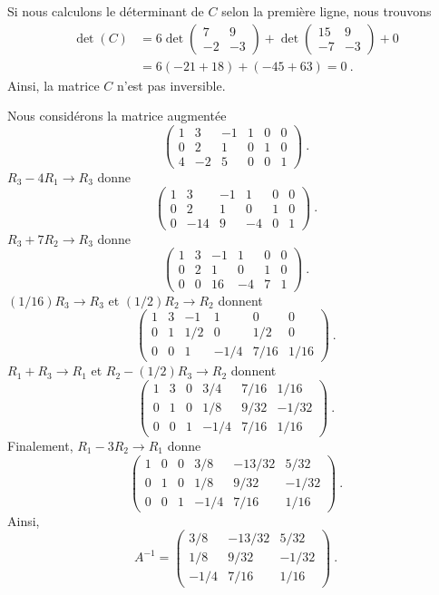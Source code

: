 { Si nous calculons le déterminant de $C$ selon la première ligne,
nous trouvons
\begin{align*}
\det(C) &=
6 \det
\begin{pmatrix}
7 & 9 \\ -2 & -3
\end{pmatrix}
+\det
\begin{pmatrix}
15 & 9 \\ -7 & -3
\end{pmatrix}
+ 0 \\
&= 6(-21+18) + (-45 + 63) = 0 \ .
\end{align*}
Ainsi, la matrice $C$ n'est pas inversible.

 Nous considérons la matrice augmentée
\[
\left(\begin{array}{ccc|ccc}
1 & 3 & -1 & 1 & 0 & 0 \\
0 & 2 & 1 & 0 & 1 & 0 \\
4 & -2 & 5 & 0 & 0 & 1
\end{array}\right) \ .
\]
$R_3-4R_1 \rightarrow R_3$ donne
\[
\left(\begin{array}{ccc|ccc}
1 & 3 & -1 & 1 & 0 & 0 \\
0 & 2 & 1 & 0 & 1 & 0 \\
0 & -14 & 9 & -4 & 0 & 1
\end{array}\right) \ .
\]
$R_3+7R_2 \rightarrow R_3$ donne
\[
\left(\begin{array}{ccc|ccc}
1 & 3 & -1 & 1 & 0 & 0 \\
0 & 2 & 1 & 0 & 1 & 0 \\
0 & 0 & 16 & -4 & 7 & 1
\end{array}\right) \ .
\]
$(1/16)R_3 \rightarrow R_3$ et $(1/2)R_2 \rightarrow R_2$ donnent
\[
\left(\begin{array}{ccc|ccc}
1 & 3 & -1 & 1 & 0 & 0 \\
0 & 1 & 1/2 & 0 & 1/2 & 0 \\
0 & 0 & 1 & -1/4 & 7/16 & 1/16
\end{array}\right) \ .
\]
$R_1+R_3\rightarrow R_1$ et $R_2 - (1/2)R_3 \rightarrow R_2$ donnent
\[
\left(\begin{array}{ccc|ccc}
1 & 3 & 0 & 3/4 & 7/16 & 1/16 \\
0 & 1 & 0 & 1/8 & 9/32 & -1/32 \\
0 & 0 & 1 & -1/4 & 7/16 & 1/16
\end{array}\right) \ .
\]
Finalement, $R_1-3R_2 \rightarrow R_1$ donne
\[
\left(\begin{array}{ccc|ccc}
1 & 0 & 0 & 3/8 & -13/32 & 5/32 \\
0 & 1 & 0 & 1/8 & 9/32 & -1/32 \\
0 & 0 & 1 & -1/4 & 7/16 & 1/16
\end{array}\right) \ .
\]
Ainsi,
\[
A^{-1} =
\begin{pmatrix}
3/8 & -13/32 & 5/32 \\
1/8 & 9/32 & -1/32 \\
-1/4 & 7/16 & 1/16
\end{pmatrix} \ .
\]
}


